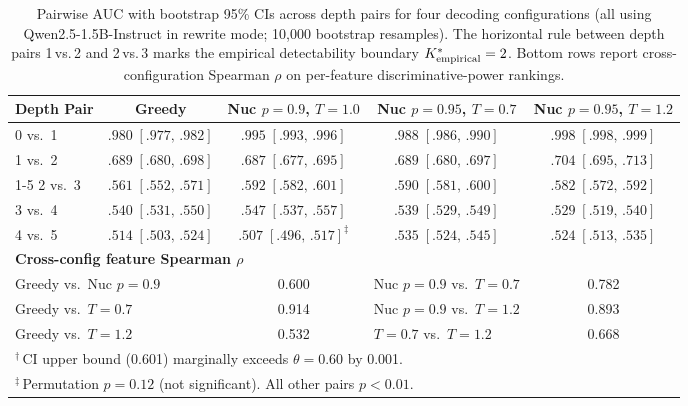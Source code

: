\begin{table}[t]
  \centering
  \caption{Pairwise AUC with bootstrap 95\% CIs across depth pairs for four decoding configurations (all using Qwen2.5-1.5B-Instruct in rewrite mode; 10{,}000 bootstrap resamples). The horizontal rule between depth pairs 1\,vs.\,2 and 2\,vs.\,3 marks the empirical detectability boundary ${K^*_{\text{empirical}}}=2$. Bottom rows report cross-configuration Spearman $\rho$ on per-feature discriminative-power rankings.}
  \label{tab:s2_decoding}
  \footnotesize
  \begin{tabular}{lcccc}
    \toprule
    \textbf{Depth Pair} & \textbf{Greedy} & \textbf{Nuc $p{=}0.9$, $T{=}1.0$} & \textbf{Nuc $p{=}0.95$, $T{=}0.7$} & \textbf{Nuc $p{=}0.95$, $T{=}1.2$} \\
    \midrule
    0 vs.\ 1 & $.980\;[.977,\,.982]$ & $.995\;[.993,\,.996]$ & $.988\;[.986,\,.990]$ & $.998\;[.998,\,.999]$ \\
    1 vs.\ 2 & $.689\;[.680,\,.698]$ & $.687\;[.677,\,.695]$ & $.689\;[.680,\,.697]$ & $.704\;[.695,\,.713]$ \\
    \cmidrule(lr){1-5}
    2 vs.\ 3 & $.561\;[.552,\,.571]$ & $.592\;[.582,\,.601]$\rlap{$^\dagger$} & $.590\;[.581,\,.600]$ & $.582\;[.572,\,.592]$ \\
    3 vs.\ 4 & $.540\;[.531,\,.550]$ & $.547\;[.537,\,.557]$ & $.539\;[.529,\,.549]$ & $.529\;[.519,\,.540]$ \\
    4 vs.\ 5 & $.514\;[.503,\,.524]$ & $.507\;[.496,\,.517]^{\ddagger}$ & $.535\;[.524,\,.545]$ & $.524\;[.513,\,.535]$ \\
    \midrule
    \multicolumn{5}{l}{\textbf{Cross-config feature Spearman $\rho$}} \\
    \midrule
    \multicolumn{2}{l}{Greedy vs.\ Nuc $p{=}0.9$} & 0.600 &
    \multicolumn{1}{l}{Nuc $p{=}0.9$ vs.\ $T{=}0.7$} & 0.782 \\
    \multicolumn{2}{l}{Greedy vs.\ $T{=}0.7$} & 0.914 &
    \multicolumn{1}{l}{Nuc $p{=}0.9$ vs.\ $T{=}1.2$} & 0.893 \\
    \multicolumn{2}{l}{Greedy vs.\ $T{=}1.2$} & 0.532 &
    \multicolumn{1}{l}{$T{=}0.7$ vs.\ $T{=}1.2$} & 0.668 \\
    \bottomrule
    \multicolumn{5}{l}{${}^{\dagger}$\,CI upper bound (0.601) marginally exceeds $\theta{=}0.60$ by 0.001.} \\
    \multicolumn{5}{l}{${}^{\ddagger}$\,Permutation $p = 0.12$ (not significant). All other pairs $p < 0.01$.}
  \end{tabular}
\end{table}

